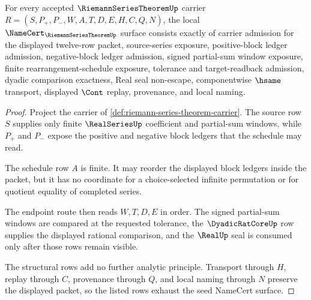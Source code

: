 \begin{theorem}
\label{thm:riemann-series-theorem-namecert-obligations}
For every accepted $\RiemannSeriesTheoremUp$ carrier $R=(S,P_{+},P_{-},W,A,T,D,E,H,C,Q,N)$, the local $\NameCert_{\RiemannSeriesTheoremUp}$ surface consists exactly of carrier admission for the displayed twelve-row packet, source-series exposure, positive-block ledger admission, negative-block ledger admission, signed partial-sum window exposure, finite rearrangement-schedule exposure, tolerance and target-readback admission, dyadic comparison exactness, Real seal non-escape, componentwise $\hsame$ transport, displayed $\Cont$ replay, provenance, and local naming.
\end{theorem}
\begin{proof}
Project the carrier of \autoref{def:riemann-series-theorem-carrier}. The source row $S$ supplies only finite $\RealSeriesUp$ coefficient and partial-sum windows, while $P_{+}$ and $P_{-}$ expose the positive and negative block ledgers that the schedule may read.

The schedule row $A$ is finite. It may reorder the displayed block ledgers inside the packet, but it has no coordinate for a choice-selected infinite permutation or for quotient equality of completed series.

The endpoint route then reads $W,T,D,E$ in order. The signed partial-sum windows are compared at the requested tolerance, the $\DyadicRatCoreUp$ row supplies the displayed rational comparison, and the $\RealUp$ seal is consumed only after those rows remain visible.

The structural rows add no further analytic principle. Transport through $H$, replay through $C$, provenance through $Q$, and local naming through $N$ preserve the displayed packet, so the listed rows exhaust the seed NameCert surface.
\end{proof}

